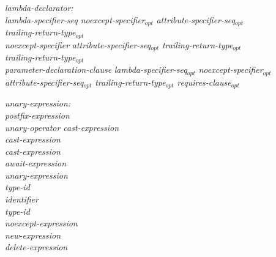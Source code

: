 \begin{adjustwidth}{0.5cm}{0.5cm}
\pagebreak %

\emph{lambda-declarator:} \\
\phantom{~~~}\emph{lambda-specifier-seq} \emph{noexcept-specifier}$_{opt}$ \emph{attribute-specifier-seq}$_{opt}$ \\
\phantom{~~~~~~}\emph{trailing-return-type}$_{opt}$ \\
\phantom{~~~}\emph{noexcept-specifier} \emph{attribute-specifier-seq}$_{opt}$ \emph{trailing-return-type}$_{opt}$  \\
\phantom{~~~}\emph{trailing-return-type}$_{opt}$ \\
\phantom{~~~}\tcode{(} \emph{parameter-declaration-clause} \tcode{)} \emph{lambda-specifier-seq}$_{opt}$ \emph{noexcept-specifier}$_{opt}$ \\ \phantom{~~~~~~}\emph{attribute-specifier-seq}$_{opt}$ \emph{trailing-return-type}$_{opt}$ \emph{requires-clause}$_{opt}$ 

\emph{unary-expression:} \\
\phantom{~~~}\emph{postfix-expression} \\
\phantom{~~~}\emph{unary-operator cast-expression} \\
\phantom{~~~}\tcode{++} \emph{cast-expression} \\
\phantom{~~~}\tcode{--} \emph{cast-expression} \\
\phantom{~~~}\emph{await-expression} \\
\phantom{~~~} \emph{unary-expression} \\
\phantom{~~~} \emph{type-id} \tcode{)} \\
\phantom{~~~} \emph{identifier} \tcode{)} \\
\phantom{~~~} \emph{type-id} \tcode{)} \\
\phantom{~~~}\emph{noexcept-expression} \\
\phantom{~~~}\emph{new-expression} \\
\phantom{~~~}\emph{delete-expression} \\
\phantom{~~~}

 \\
\phantom{~~~} \\
\phantom{~~~}


\end{adjustwidth}
